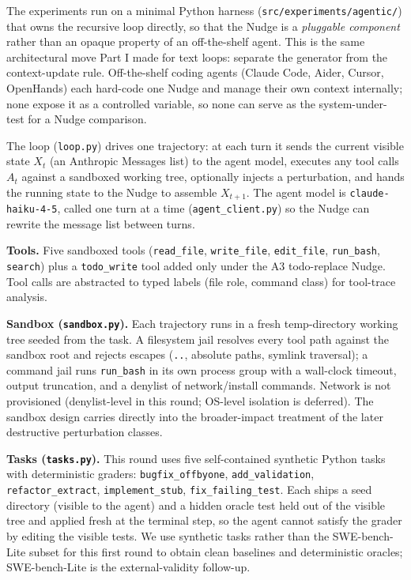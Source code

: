 \documentclass{article}
\theoremstyle{plain}
\theoremstyle{definition}
\begin{document}
The experiments run on a minimal Python harness (\texttt{src/experiments/agentic/}) that owns the recursive loop directly, so that the Nudge is a \textit{pluggable component} rather than an opaque property of an off-the-shelf agent. This is the same architectural move Part I made for text loops: separate the generator from the context-update rule. Off-the-shelf coding agents (Claude Code, Aider, Cursor, OpenHands) each hard-code one Nudge and manage their own context internally; none expose it as a controlled variable, so none can serve as the system-under-test for a Nudge comparison.

The loop (\texttt{loop.py}) drives one trajectory: at each turn it sends the current visible state $X_t$ (an Anthropic Messages list) to the agent model, executes any tool calls $A_t$ against a sandboxed working tree, optionally injects a perturbation, and hands the running state to the Nudge to assemble $X_{t+1}$. The agent model is \texttt{claude-haiku-4-5}, called one turn at a time (\texttt{agent\_client.py}) so the Nudge can rewrite the message list between turns.

\textbf{Tools.} Five sandboxed tools (\texttt{read\_file}, \texttt{write\_file}, \texttt{edit\_file}, \texttt{run\_bash}, \texttt{search}) plus a \texttt{todo\_write} tool added only under the A3 todo-replace Nudge. Tool calls are abstracted to typed labels (file role, command class) for tool-trace analysis.

\textbf{Sandbox (\texttt{sandbox.py}).} Each trajectory runs in a fresh temp-directory working tree seeded from the task. A filesystem jail resolves every tool path against the sandbox root and rejects escapes (\texttt{..}, absolute paths, symlink traversal); a command jail runs \texttt{run\_bash} in its own process group with a wall-clock timeout, output truncation, and a denylist of network/install commands. Network is not provisioned (denylist-level in this round; OS-level isolation is deferred). The sandbox design carries directly into the broader-impact treatment of the later destructive perturbation classes.

\textbf{Tasks (\texttt{tasks.py}).} This round uses five self-contained synthetic Python tasks with deterministic graders: \texttt{bugfix\_offbyone}, \texttt{add\_validation}, \texttt{refactor\_extract}, \texttt{implement\_stub}, \texttt{fix\_failing\_test}. Each ships a seed directory (visible to the agent) and a hidden oracle test held out of the visible tree and applied fresh at the terminal step, so the agent cannot satisfy the grader by editing the visible tests. We use synthetic tasks rather than the SWE-bench-Lite subset for this first round to obtain clean baselines and deterministic oracles; SWE-bench-Lite is the external-validity follow-up.
\end{document}
